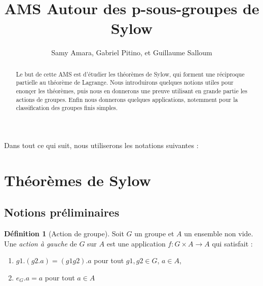 \documentclass{article}
\title{AMS Autour des p-sous-groupes de Sylow}
\author{Samy Amara, Gabriel Pitino, et Guillaume Salloum}
\date{}
\theoremstyle{definition}
\newtheorem{definition}[subsubsection]{Définition}
\theoremstyle{plain}
\theoremstyle{plain}
\theoremstyle{plain}
\theoremstyle{plain}
\theoremstyle{definition}
\theoremstyle{plain}
\theoremstyle{plain}
\begin{document}
\maketitle

\begin{abstract}
	Le but de cette AMS est d'étudier les théorèmes de Sylow, qui forment une réciproque partielle au théorème de Lagrange.
	Nous introduirons quelques notions utiles pour enonçer les théorèmes, puis nous en donnerons une preuve utilisant en grande partie les actions de groupes.
	Enfin nous donnerons quelques applications, notemment pour la classification des groupes finis simples.%
\end{abstract}



\tableofcontents
\clearpage

Dans tout ce qui suit, nous utiliserons les notations suivantes :
\glsaddall
\renewcommand*{\arraystretch}{1.2} %
\printnoidxglossary[title=Notations,type=symbols,style=long,sort=standard,nonumberlist]

\clearpage

\section{Théorèmes de Sylow}
\subsection{Notions préliminaires}


\begin{definition}[Action de groupe]
	Soit \( G \) un groupe et \( A \) un ensemble non vide. Une \textit{action à gauche} de \( G \) sur \( A \) est une application \( f : G \times A \rightarrow A\) qui satisfait :
	\begin{enumerate}[label = (\roman*)]
		\item \(g1.(g2.a) = (g1g2).a \) pour tout \(g1,g2 \in G\), \(a \in A\),
		\item \(e_G.a = a\) pour tout \(a \in A\)
	\end{enumerate}

\end{definition}
\end{document}
